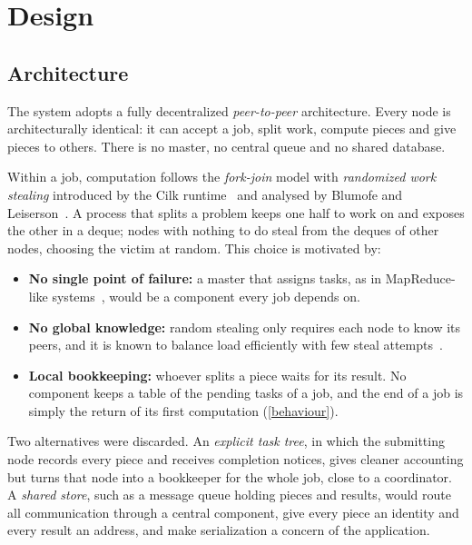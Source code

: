 \documentclass{scrartcl}
\begin{document}
\section{Design}\label{design}

\subsection{Architecture}\label{architecture}

The system adopts a fully decentralized \emph{peer-to-peer} architecture.
%
Every node is architecturally identical: it can accept a job, split work, compute pieces and give pieces to others.
%
There is no master, no central queue and no shared database.

Within a job, computation follows the \emph{fork-join} model with \emph{randomized work stealing} introduced by the Cilk runtime~\cite{frigo1998cilk} and analysed by Blumofe and Leiserson~\cite{blumofe1999scheduling}.
%
A process that splits a problem keeps one half to work on and exposes the other in a deque; nodes with nothing to do steal from the deques of other nodes, choosing the victim at random.
%
This choice is motivated by:
%
\begin{itemize}
  \item \textbf{No single point of failure:} a master that assigns tasks, as in MapReduce-like systems~\cite{dean2004mapreduce}, would be a component every job depends on.
  \item \textbf{No global knowledge:} random stealing only requires each node to know its peers, and it is known to balance load efficiently with few steal attempts~\cite{blumofe1999scheduling}.
  \item \textbf{Local bookkeeping:} whoever splits a piece waits for its result. No component keeps a table of the pending tasks of a job, and the end of a job is simply the return of its first computation (\cref{behaviour}).
\end{itemize}

Two alternatives were discarded.
%
An \emph{explicit task tree}, in which the submitting node records every piece and receives completion notices, gives cleaner accounting but turns that node into a bookkeeper for the whole job, close to a coordinator.
%
A \emph{shared store}, such as a message queue holding pieces and results, would route all communication through a central component, give every piece an identity and every result an address, and make serialization a concern of the application.
\end{document}
